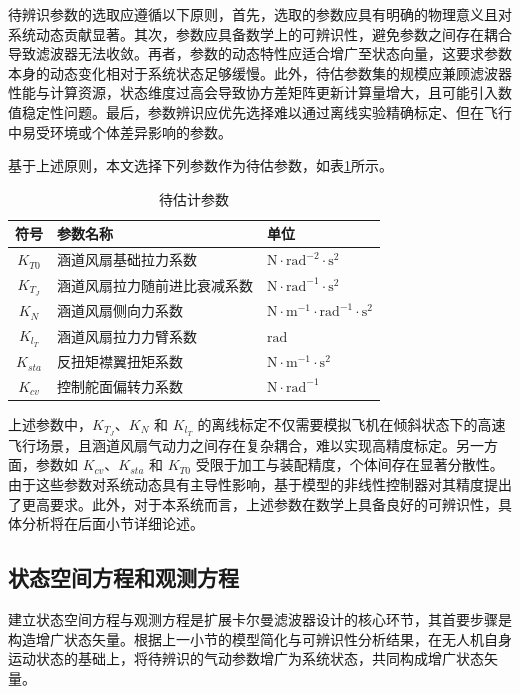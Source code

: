 待辨识参数的选取应遵循以下原则，首先，选取的参数应具有明确的物理意义且对系统动态贡献显著。其次，参数应具备数学上的可辨识性，避免参数之间存在耦合导致滤波器无法收敛。再者，参数的动态特性应适合增广至状态向量，这要求参数本身的动态变化相对于系统状态足够缓慢。此外，待估参数集的规模应兼顾滤波器性能与计算资源，状态维度过高会导致协方差矩阵更新计算量增大，且可能引入数值稳定性问题。最后，参数辨识应优先选择难以通过离线实验精确标定、但在飞行中易受环境或个体差异影响的参数。

基于上述原则，本文选择下列参数作为待估参数，如表\ref{tab:params_est}所示。

\begin{table}[htbp]
    \centering
    \caption{\label{tab:params_est}待估计参数}
    \begin{tabular}{cll}
    \toprule
    符号 & 参数名称 & 单位\tabularnewline
    \midrule
    $K_{T0}$ \hfill & 涵道风扇基础拉力系数 & $\mathrm{N \cdot rad ^{-2} \cdot s^2}$ \tabularnewline
    $K_{T_J}$ \hfill & 涵道风扇拉力随前进比衰减系数 &  $\mathrm{N \cdot rad ^{-1} \cdot s^2}$ \tabularnewline
    $K_{N}$ \hfill & 涵道风扇侧向力系数 & $\mathrm{N \cdot m^{-1} \cdot rad ^{-1} \cdot s^2}$ \tabularnewline
    $K_{l_T}$ \hfill & 涵道风扇拉力力臂系数 & $\mathrm{rad}$ \tabularnewline
    $K_{sta}$ \hfill & 反扭矩襟翼扭矩系数 & $\mathrm{N \cdot m^{-1} \cdot s^2}$ \tabularnewline
    $K_{cv}$ \hfill & 控制舵面偏转力系数 & $\mathrm{N \cdot rad^{-1}}$ \tabularnewline
    \bottomrule
    \end{tabular}
\end{table}

上述参数中，$K_{T_J}$、$K_{N}$ 和 $K_{l_T}$ 的离线标定不仅需要模拟飞机在倾斜状态下的高速飞行场景，且涵道风扇气动力之间存在复杂耦合，难以实现高精度标定。另一方面，参数如 $K_{cv}$、$K_{sta}$ 和 $K_{T0}$ 受限于加工与装配精度，个体间存在显著分散性。由于这些参数对系统动态具有主导性影响，基于模型的非线性控制器对其精度提出了更高要求。此外，对于本系统而言，上述参数在数学上具备良好的可辨识性，具体分析将在后面小节详细论述。

\subsection{状态空间方程和观测方程} %
建立状态空间方程与观测方程是扩展卡尔曼滤波器设计的核心环节，其首要步骤是构造增广状态矢量。根据上一小节的模型简化与可辨识性分析结果，在无人机自身运动状态的基础上，将待辨识的气动参数增广为系统状态，共同构成增广状态矢量。

